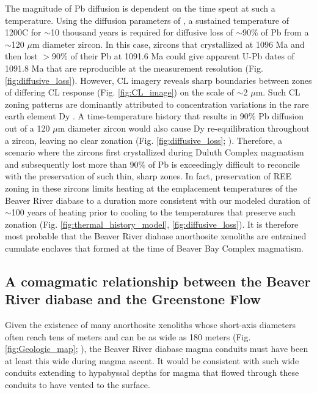 \documentclass[draft]{agujournal2019}
\begin{document}
The magnitude of Pb diffusion is dependent on the time spent at such a temperature. Using the diffusion parameters of , a sustained temperature of 1200\textdegree C for $\sim$10 thousand years is required for diffusive loss of $\sim$90\% of Pb from a $\sim$120 $\mu$m diameter zircon. In this case, zircons that crystallized at 1096 Ma and then lost $>$90\% of their Pb at 1091.6 Ma could give apparent U-Pb dates of 1091.8 Ma that are reproducible at the measurement resolution (Fig. \ref{fig:diffusive_loss}). However, CL imagery reveals sharp boundaries between zones of differing CL response (Fig. \ref{fig:CL_image}) on the scale of $\sim$2 $\mu$m. Such CL zoning patterns are dominantly attributed to concentration variations in the rare earth element Dy \cite{Remond1992a}. A time-temperature history that results in 90\% Pb diffusion out of a 120 $\mu$m diameter zircon would also cause Dy re-equilibration throughout a zircon, leaving no clear zonation (Fig. \ref{fig:diffusive_loss}; ). Therefore, a scenario where the zircons first crystallized during Duluth Complex magmatism and subsequently lost more than 90\% of Pb is exceedingly difficult to reconcile with the preservation of such thin, sharp zones. In fact, preservation of REE zoning in these zircons limits heating at the emplacement temperatures of the Beaver River diabase to a duration more consistent with our modeled duration of $\sim$100 years of heating prior to cooling to the temperatures that preserve such zonation (Fig. \ref{fig:thermal_history_model}, \ref{fig:diffusive_loss}). It is therefore most probable that the Beaver River diabase anorthosite xenoliths are entrained cumulate enclaves that formed at the time of Beaver Bay Complex magmatism. 

\subsection{A comagmatic relationship between the Beaver River diabase and the Greenstone Flow}

Given the existence of many anorthosite xenoliths whose short-axis diameters often reach tens of meters and can be as wide as 180 meters (Fig. \ref{fig:Geologic_map}; ), the Beaver River diabase magma conduits must have been at least this wide during magma ascent. It would be consistent with such wide conduits extending to hypabyssal depths for magma that flowed through these conduits to have vented to the surface.
 
\end{document}

